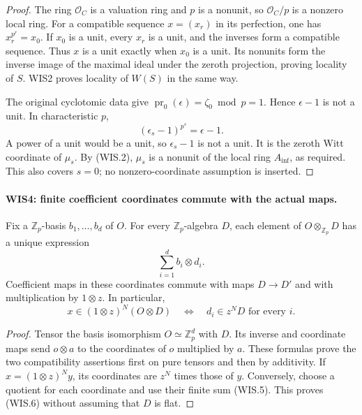 \begin{proof}
The ring $\mathcal O_C$ is a valuation ring and $p$ is a nonunit,
so $\mathcal O_C/p$ is a nonzero local ring. For a compatible
sequence $x=(x_r)$ in its perfection, one has
$x_r^{p^r}=x_0$. If $x_0$ is a unit, every $x_r$ is a unit,
and the inverses form a compatible sequence. Thus $x$ is a unit
exactly when $x_0$ is a unit. Its nonunits form the inverse
image of the maximal ideal under the zeroth projection, proving
locality of $S$. WIS2 proves locality of $W(S)$ in the same way.

The original cyclotomic data give
$\operatorname{pr}_0(\epsilon)=\zeta_0\bmod p=1$.
Hence $\epsilon-1$ is not a unit.
In characteristic $p$,
\[
                     (\epsilon_s-1)^{p^s}=\epsilon-1.
\]
A power of a unit would be a unit, so $\epsilon_s-1$ is not
a unit. It is the zeroth Witt coordinate of $\mu_s$.
By (WIS.2), $\mu_s$ is a nonunit of the local ring $A_{\inf}$,
as required. This also covers $s=0$; no nonzero-coordinate
assumption is inserted.
\end{proof}

\paragraph{WIS4: finite coefficient coordinates commute with the actual maps.}
\label{claim:WIS4}
Fix a $\mathbb Z_p$-basis $b_1,\ldots,b_d$ of $O$. For every
$\mathbb Z_p$-algebra $D$, each element of $O\otimes_{\mathbb Z_p}D$
has a unique expression
\[
                          \sum_{i=1}^d b_i\otimes d_i.      \tag{WIS.5}
\]
Coefficient maps in these coordinates commute with maps $D\to D'$
and with multiplication by $1\otimes z$. In particular,
\[
 x\in(1\otimes z)^N(O\otimes D)
       \quad\Longleftrightarrow\quad d_i\in z^ND
                      \text{ for every }i.               \tag{WIS.6}
\]

\begin{proof}
Tensor the basis isomorphism $O\simeq\mathbb Z_p^d$ with $D$.
Its inverse and coordinate maps send $o\otimes a$ to the
coordinates of $o$ multiplied by $a$. These formulas prove
the two compatibility assertions first on pure tensors and
then by additivity. If $x=(1\otimes z)^Ny$, its coordinates
are $z^N$ times those of $y$. Conversely, choose a quotient
for each coordinate and use their finite sum (WIS.5).
This proves (WIS.6) without assuming that $D$ is flat.
\end{proof}

